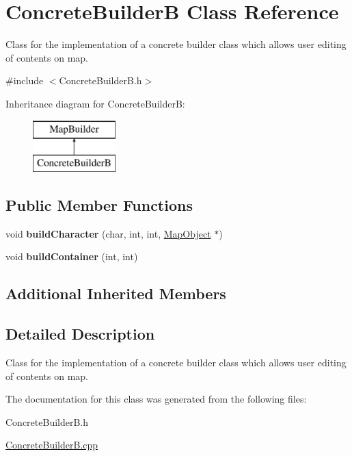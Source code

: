 \hypertarget{class_concrete_builder_b}{}\section{Concrete\+BuilderB Class Reference}
\label{class_concrete_builder_b}


Class for the implementation of a concrete builder class which allows user editing of contents on map.  




{\ttfamily \#include $<$Concrete\+Builder\+B.\+h$>$}

Inheritance diagram for Concrete\+BuilderB\+:\begin{figure}[H]
\begin{center}
\leavevmode
\includegraphics[height=2.000000cm]{class_concrete_builder_b}
\end{center}
\end{figure}
\subsection*{Public Member Functions}
\begin{DoxyCompactItemize}
\item 
\hypertarget{class_concrete_builder_b_a71b5a6a7cd48a512c3eae536d95c41cf}{}\label{class_concrete_builder_b_a71b5a6a7cd48a512c3eae536d95c41cf} 
void {\bfseries build\+Character} (char, int, int, \hyperlink{class_map_object}{Map\+Object} $\ast$)
\item 
\hypertarget{class_concrete_builder_b_a789bea926798f77e30fba68fab1f48bc}{}\label{class_concrete_builder_b_a789bea926798f77e30fba68fab1f48bc} 
void {\bfseries build\+Container} (int, int)
\end{DoxyCompactItemize}
\subsection*{Additional Inherited Members}


\subsection{Detailed Description}
Class for the implementation of a concrete builder class which allows user editing of contents on map. 

The documentation for this class was generated from the following files\+:\begin{DoxyCompactItemize}
\item 
Concrete\+Builder\+B.\+h\item 
\hyperlink{_concrete_builder_b_8cpp}{Concrete\+Builder\+B.\+cpp}\end{DoxyCompactItemize}
